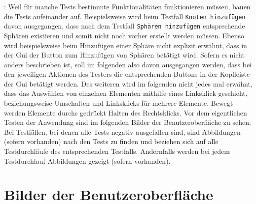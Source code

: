 \documentclass[enabledeprecatedfontcommands]{scrartcl}
\begin{document}
	
\newpage
\hspace{-0.4cm}: Weil für manche Tests bestimmte Funktionalitäten funktionieren müssen, bauen die Tests aufeinander auf. Beispielsweise wird beim Testfall \texttt{Knoten hinzufügen} davon ausgegangen, dass nach dem Testfall \texttt{Sphären hinzufügen} entsprechende Sphären existieren und somit nicht noch vorher erstellt werden müssen. Ebenso wird beispielsweise beim Hinzufügen einer Sphäre nicht explizit erwähnt, dass in der Gui der Button zum Hinzufügen von Sphären betätigt wird. Sofern es nicht anders beschrieben ist, soll im folgenden also davon ausgegangen werden, dass bei den jeweiligen Aktionen des Testers die entsprechenden Buttons in der Kopfleiste der Gui betätigt werden. Des weiteren wird im folgenden nicht jedes mal erwähnt, dass das Auswählen von einzelnen Elementen mithilfe eines Linksklick geschieht, beziehungsweise Umschalten und Linksklicks für mehrere Elemente. Bewegt werden Elemente durchs gedrückt Halten des Rechtsklicks. Vor dem eigentlichen Testen der Anwendung sind im folgenden Bilder der Benutzeroberfläche zu sehen. Bei Testfällen, bei denen alle Tests negativ ausgefallen sind, sind Abbildungen (sofern vorhanden) nach den Tests zu finden und beziehen sich auf alle Testdurchläufe des entsprechenden Testfalls. Andernfalls werden bei jedem Testdurchlauf Abbildungen gezeigt (sofern vorhanden).  \\

\newpage

\thispagestyle{fancy}
\fancyhead{}

\fancyfoot{}
\renewcommand{\headrulewidth}{0.4pt}
\tableofcontents

\newpage


\section{Bilder der Benutzeroberfläche}
\end{document}
